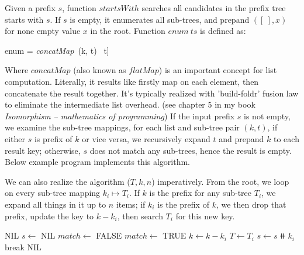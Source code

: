 \documentclass[b5paper]{article}
\begin{document}
Given a prefix $s$, function $startsWith$ searches all candidates in the prefix tree starts with $s$. If $s$ is empty, it enumerates all sub-trees, and prepand $([\ ], x)$ for none empty value $x$ in the root. Function $enum\ ts$ is defined as:

\be
enum = \textit{concatMap}\ (k, t) \mapsto [(k \doubleplus a, b) | (a, b) \in startsWith\ [\ ]\ t]
\ee

Where $\textit{concatMap}$ (also known as $\textit{flatMap}$) is an important concept for list computation. Literally, it results like firstly map on each element, then concatenate the result together. It's typically realized with 'build-foldr' fusion law to eliminate the intermediate list overhead. (see chapter 5 in my book {\em Isomorphism -- mathematics of programming}) If the input prefix $s$ is not empty, we examine the sub-tree mappings, for each list and sub-tree pair $(k, t)$, if either $s$ is prefix of $k$ or vice versa, we recursively expand $t$ and prepand $k$ to each result key; otherwise, $s$ does not match any sub-trees, hence the result is empty. Below example program implements this algorithm.


We can also realize the algorithm ($T, k, n$) imperatively. From the root, we loop on every sub-tree mapping $k_i \mapsto T_i$. If $k$ is the prefix for any sub-tree $T_i$, we expand all things in it up to $n$ items; if $k_i$ is the prefix of $k$, we then drop that prefix, update the key to $k - k_i$, then search $T_i$ for this new key.

\begin{algorithmic}[1]
     \State \Return NIL
  \EndIf
  \State $s \gets$ NIL
  \Repeat
    \State $match \gets$ FALSE
        \State \Return {}
      \EndIf
        \State $match \gets$ TRUE
        \State $k \gets k - k_i$  
        \State $T \gets T_i$
        \State $s \gets s \doubleplus k_i$
        \State break
      \EndIf
    \EndFor
  \State \Return NIL
\EndFunction
\end{algorithmic}
\end{document}
